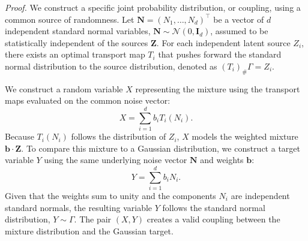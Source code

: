 \documentclass[12pt,a4paper,twoside,openany]{book}
\begin{document}
\textit{Proof.} We construct a specific joint probability distribution, or coupling, using a common source of randomness. 
Let $\mathbf{N} = (N_1, \dots, N_d)^\top$ be a vector of $d$ independent standard normal variables, $\mathbf{N} \sim \mathcal{N}(0, \mathbf{I}_d)$, 
assumed to be statistically independent of the sources $\mathbf{Z}$. For each independent latent source $Z_i$, 
there exists an optimal transport map $T_i$ that pushes forward the standard normal distribution to the source distribution, 
denoted as $(T_i)_{\#} \Gamma = Z_i$. 

We construct a random variable $X$ representing the mixture using the transport maps evaluated on the common noise vector:
\begin{equation}
    X = \sum_{i=1}^d b_i T_i(N_i).
\end{equation}
Because $T_i(N_i)$ follows the distribution of $Z_i$, $X$ models the weighted mixture $\mathbf{b} \cdot \mathbf{Z}$. 
To compare this mixture to a Gaussian distribution, we construct a target variable $Y$ using the same underlying noise vector $\mathbf{N}$ and 
weights $\mathbf{b}$:
\begin{equation}
    Y = \sum_{i=1}^d b_i N_i.
\end{equation}
Given that the weights sum to unity and the components $N_i$ are independent standard normals, 
the resulting variable $Y$ follows the standard normal distribution, $Y \sim \Gamma$. 
The pair $(X, Y)$ creates a valid coupling between the mixture distribution and the Gaussian target.
\end{document}
